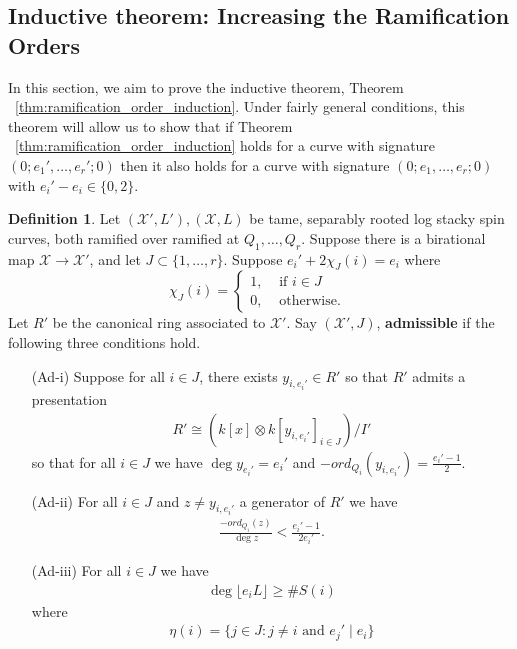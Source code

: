 \documentclass{amsart}
\theoremstyle{plain}
\theoremstyle{definition}
\newtheorem{defn}[thm]{Definition}
\theoremstyle{remark}
\numberwithin{equation}{section}
\newcommand\ssec{\subsection}
\newcommand \sx{\mathscr X}
\newcommand \subhalf[1]{\frac{{#1} - 1}{2{#1}}}
\begin{document}
\ssec{Inductive theorem: Increasing the Ramification Orders}
\label{ssec:g_0_ram_orders}
In this section, we aim to prove the inductive theorem, Theorem ~\ref{thm:ramification_order_induction}. Under fairly general conditions, this theorem will allow us to show that if Theorem ~\ref{thm:ramification_order_induction} holds for a curve with signature $(0;e_1',\ldots, e_r';0)$ then it also holds for a curve with signature $(0;e_1,\ldots, e_r;0)$ with $e_i' - e_i \in \{0,2\}$.

\begin{defn}
\label{defn:admissible}
Let $(\sx',L'),(\sx,L)$ be tame, separably rooted log stacky spin curves, both ramified over ramified at $Q_1,\ldots, Q_r$. Suppose there is a birational map $\sx \rightarrow \sx'$, and let $J \subset \{1,
\ldots, r\}$. Suppose $e_i'+ 2\chi_J(i) = e_i$ where
$$
\chi_J(i) = \begin{cases}
	1, &\text{ if }i \in J\\
	0, &\text{ otherwise. } 
\end{cases}$$
Let $R'$ be the canonical ring associated to $\sx'$. Say $(\sx',J)$, {\bf admissible} if the following three conditions hold.
\begin{enumerate}
	\item[(Ad-i)] Suppose for all $i \in J$, there exists $y_{i,e_i'} \in R'$ so that $R'$ admits a presentation
\begin{align*}
	R' \cong \left( k[x] \otimes k[y_{i,e_i'}]_{i \in J} \right)/I'
\end{align*}
so that for all $i \in J$ we have $\deg y_{e_i'} = e_i'$ and $-ord_{Q_i}(y_{i,e_i'}) = \frac{e_i'-1}{2}$.
\item[(Ad-ii)] For all $i \in J$ and $z \neq y_{i,e_i'}$ a generator of $R'$ we have
\begin{align*}
	\frac{- ord_{Q_i}(z)}{\deg z} < \subhalf {e_i'}.
\end{align*}
\item[(Ad-iii)] For all $i \in J$ we have
\begin{align*}
	\deg \lfloor e_i L \rfloor \geq \# S(i)
\end{align*}
where
\begin{align*}
	\eta(i) = \{j \in J : j \neq i \text{ and }e_j' \mid e_i\}
\end{align*}
\end{enumerate}
\end{defn}
\end{document}
